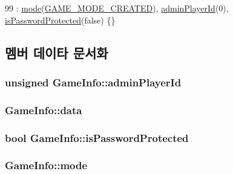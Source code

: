 \begin{DoxyCode}
99 : \hyperlink{struct_game_info_a22140503539e3356bf8b19b041ccf934}{mode}(\hyperlink{gamedata_8h_aaf5ef5a17b53e9997c837b07015589dea5189be813705a7ad4b236a347c394328}{GAME\_MODE\_CREATED}), \hyperlink{struct_game_info_a5ecc1639834e9a6f8055f38c1f18c2d9}{adminPlayerId}(0), 
      \hyperlink{struct_game_info_a0d282d0891f202cffd9f2b4d55721123}{isPasswordProtected}(\textcolor{keyword}{false}) \{\}
\end{DoxyCode}


\subsection{멤버 데이타 문서화}
\hypertarget{struct_game_info_a5ecc1639834e9a6f8055f38c1f18c2d9}{
\subsubsection[{admin\-Player\-Id}]{\setlength{\rightskip}{0pt plus 5cm}unsigned Game\-Info\-::admin\-Player\-Id}}\label{struct_game_info_a5ecc1639834e9a6f8055f38c1f18c2d9}
\hypertarget{struct_game_info_adda7dce486bafa025f007cc38fb5ff4c}{
\subsubsection[{data}]{ Game\-Info\-::data}}\label{struct_game_info_adda7dce486bafa025f007cc38fb5ff4c}
\hypertarget{struct_game_info_a0d282d0891f202cffd9f2b4d55721123}{
\subsubsection[{is\-Password\-Protected}]{\setlength{\rightskip}{0pt plus 5cm}bool Game\-Info\-::is\-Password\-Protected}}\label{struct_game_info_a0d282d0891f202cffd9f2b4d55721123}
\hypertarget{struct_game_info_a22140503539e3356bf8b19b041ccf934}{
\subsubsection[{mode}]{ Game\-Info\-::mode}}\label{struct_game_info_a22140503539e3356bf8b19b041ccf934}
